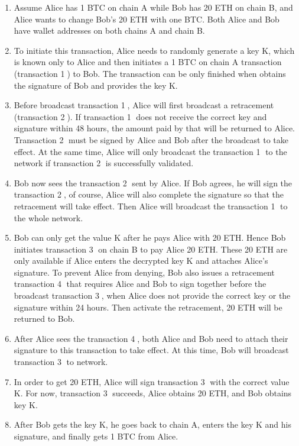 \begin{enumerate}
  \item Assume Alice has 1 BTC on chain A while Bob has 20 ETH on chain B, and Alice wants to change Bob's 20 ETH with one BTC. Both Alice and Bob have wallet addresses on both chains A and chain B.
    \item To initiate this transaction, Alice needs to randomly generate a key K, which is known only to Alice and then initiates a 1 BTC on chain A transaction (transaction \textcircled{1}) to Bob. The transaction can be only finished when obtains the signature of Bob and provides the key K.
    \item Before broadcast transaction \textcircled{1}, Alice will first broadcast a retracement (transaction \textcircled{2}). If transaction \textcircled{1} does not receive the correct key and signature within 48 hours, the amount paid by that will be returned to Alice. Transaction \textcircled{2} must be signed by Alice and Bob after the broadcast to take effect. At the same time, Alice will only broadcast the transaction \textcircled{1} to the network if transaction \textcircled{2} is successfully validated.
    \item Bob now sees the transaction \textcircled{2} sent by Alice. If Bob agrees, he will sign the transaction \textcircled{2}, of course, Alice will also complete the signature so that the retracement will take effect. Then Alice will broadcast the transaction \textcircled{1} to the whole network.
    \item Bob can only get the value K after he pays Alice with 20 ETH. Hence Bob initiates transaction \textcircled{3} on chain B to pay Alice 20 ETH. These 20 ETH are only available if Alice enters the decrypted key K and attaches Alice's signature. To prevent Alice from denying, Bob also issues a retracement transaction \textcircled{4} that requires Alice and Bob to sign together before the broadcast transaction \textcircled{3}, when Alice does not provide the correct key or the signature within 24 hours. Then activate the retracement, 20 ETH will be returned to Bob.
    \item After Alice sees the transaction \textcircled{4}, both Alice and Bob need to attach their signature to this transaction to take effect. At this time, Bob will broadcast transaction \textcircled{3} to network.
    \item In order to get 20 ETH, Alice will sign transaction \textcircled{3} with the correct value K. For now, transaction \textcircled{3} succeeds, Alice obtains 20 ETH, and Bob obtains key K.
    \item After Bob gets the key K, he goes back to chain A, enters the key K and his signature, and finally gets 1 BTC from Alice.
\end{enumerate}
